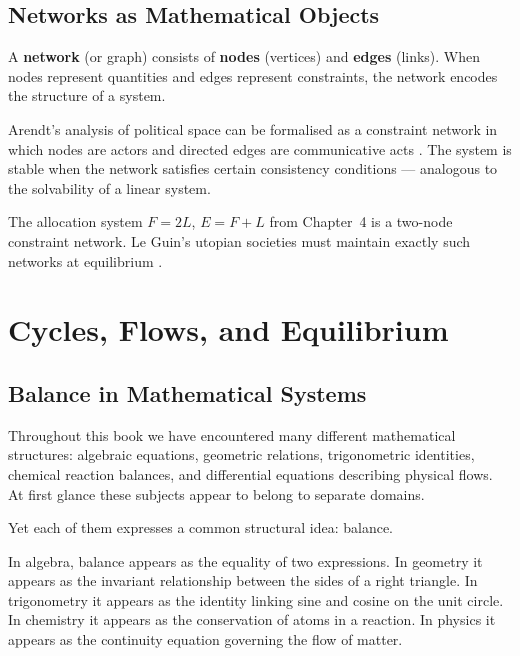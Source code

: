 \documentclass[11pt, openany]{book}
\theoremstyle{plain}
\theoremstyle{definition}
\theoremstyle{remark}
\begin{document}
\section{Networks as Mathematical Objects}

A \textbf{network} (or graph) consists of \textbf{nodes} (vertices) and
\textbf{edges} (links). When nodes represent quantities and edges represent
constraints, the network encodes the structure of a system.

\begin{myexample}
Arendt's analysis of political space can be formalised as a constraint network
in which nodes are actors and directed edges are communicative acts
\citep{Arendt1958}. The system is stable when the network satisfies certain
consistency conditions --- analogous to the solvability of a linear system.
\end{myexample}

\begin{myexample}
The allocation system $F=2L$, $E=F+L$ from Chapter~4 is a two-node constraint
network. Le Guin's utopian societies must maintain exactly such networks at
equilibrium \citep{LeGuin1974}.
\end{myexample}

\chapter{Cycles, Flows, and Equilibrium}

\section*{Balance in Mathematical Systems}

Throughout this book we have encountered many different mathematical
structures: algebraic equations, geometric relations, trigonometric
identities, chemical reaction balances, and differential equations
describing physical flows. At first glance these subjects appear to
belong to separate domains.

Yet each of them expresses a common structural idea: balance.

In algebra, balance appears as the equality of two expressions. In
geometry it appears as the invariant relationship between the sides of a
right triangle. In trigonometry it appears as the identity linking sine
and cosine on the unit circle. In chemistry it appears as the
conservation of atoms in a reaction. In physics it appears as the
continuity equation governing the flow of matter.
\end{document}
